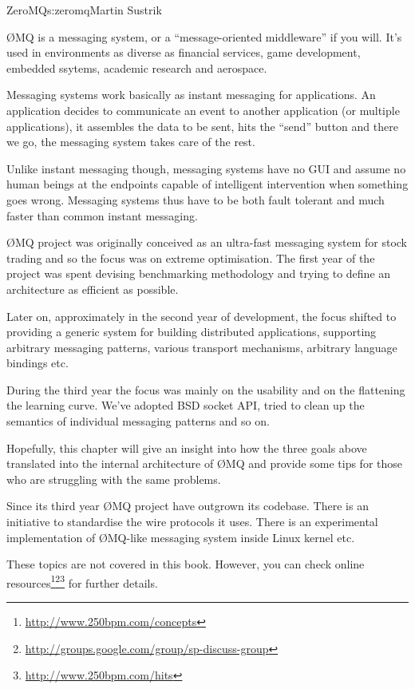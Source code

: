 \begin{aosachapter}{ZeroMQ}{s:zeromq}{Martin Sustrik}


ØMQ is a messaging system, or a ``message-oriented middleware'' if you
will. It's used in environments as diverse as financial services, game
development, embedded ssytems, academic research and aerospace.

Messaging systems work basically as instant messaging for
applications. An application decides to communicate an event to
another application (or multiple applications), it assembles the data
to be sent, hits the ``send'' button and there we go, the messaging
system takes care of the rest.

Unlike instant messaging though, messaging systems have no GUI and
assume no human beings at the endpoints capable of intelligent
intervention when something goes wrong. Messaging systems thus have to
be both fault tolerant and much faster than common instant messaging.

ØMQ project was originally conceived as an ultra-fast messaging system
for stock trading and so the focus was on extreme optimisation. The
first year of the project was spent devising benchmarking methodology
and trying to define an architecture as efficient as possible.

Later on, approximately in the second year of development, the focus
shifted to providing a generic system for building distributed
applications, supporting arbitrary messaging patterns, various
transport mechanisms, arbitrary language bindings etc.

During the third year the focus was mainly on the usability and on the
flattening the learning curve. We've adopted BSD socket API, tried to
clean up the semantics of individual messaging patterns and so on.

Hopefully, this chapter will give an insight into how the three goals
above translated into the internal architecture of ØMQ and provide
some tips for those who are struggling with the same problems.

Since its third year ØMQ project have outgrown its codebase. There is
an initiative to standardise the wire protocols it uses. There is an
experimental implementation of ØMQ-like messaging system inside Linux
kernel etc.

These topics are not covered in this book. However, you can check
online
resources\footnote{\url{http://www.250bpm.com/concepts}}\footnote{\url{http://groups.google.com/group/sp-discuss-group}}\footnote{\url{http://www.250bpm.com/hits}}
for further details.


\end{aosachapter}
